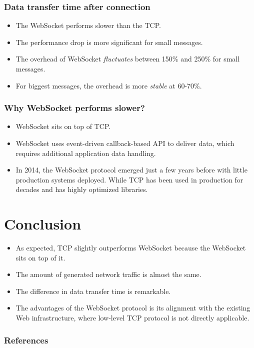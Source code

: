 \documentclass{beamer}
\begin{document}
\begin{frame}
    \frametitle{Data transfer time after connection}
    \begin{itemize}[<+->]
        \item The WebSocket performs slower than the TCP.
        \item The performance drop is more significant for small messages.
        \item The overhead of WebSocket \textit{fluctuates} between 150\% and 250\% for small
              messages.
        \item For biggest messages, the overhead is more \textit{stable} at 60-70\%.
    \end{itemize}
\end{frame}

\begin{frame}
    \frametitle{Why WebSocket performs slower?}
    \begin{itemize}[<+->]
        \item WebSocket sits on top of TCP.
        \item WebSocket uses event-driven callback-based API to deliver data, which requires
              additional application data handling.
        \item In 2014, the WebSocket protocol emerged just a few years before with little
              production systems deployed. While TCP has been used in production for decades
              and has highly optimized libraries.
    \end{itemize}
\end{frame}

\section{Conclusion}
\begin{frame}
    \begin{itemize}[<+->]
        \item As expected, TCP slightly outperforms WebSocket because the WebSocket sits on
              top of it.
        \item The amount of generated network traffic is almost the same.
        \item The difference in data transfer time is remarkable.
        \item The advantages of the WebSocket protocol is its alignment with the existing Web
              infrastructure, where low-level TCP protocol is not directly applicable.
    \end{itemize}
\end{frame}

\begin{frame}
    \nocite{*}
    \frametitle{References}
    
    
\end{frame}
\end{document}

